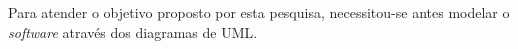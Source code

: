 	
	\par Para atender o objetivo proposto por esta pesquisa, necessitou-se antes
modelar o \textit{software} através dos diagramas de UML.
